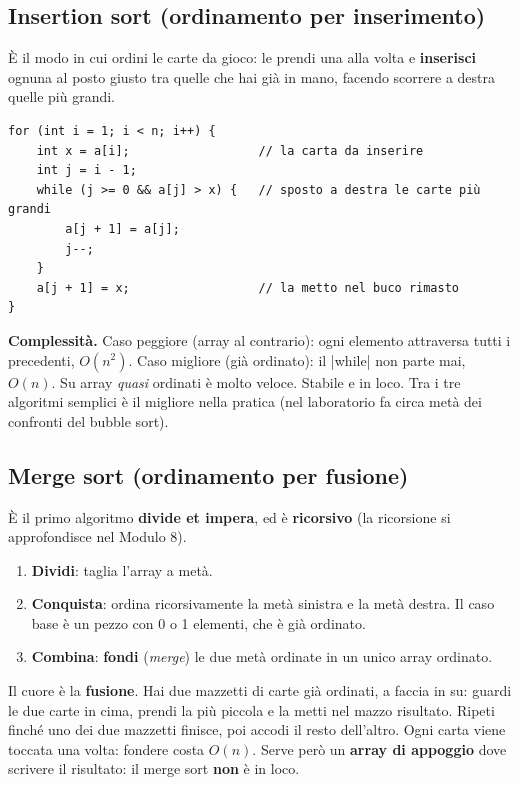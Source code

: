 \subsection*{Insertion sort (ordinamento per inserimento)}

\begin{analogia}
È il modo in cui ordini le carte da gioco: le prendi una alla volta e
\textbf{inserisci} ognuna al posto giusto tra quelle che hai già in mano, facendo
scorrere a destra quelle più grandi.
\end{analogia}

\begin{lstlisting}
for (int i = 1; i < n; i++) {
    int x = a[i];                  // la carta da inserire
    int j = i - 1;
    while (j >= 0 && a[j] > x) {   // sposto a destra le carte più grandi
        a[j + 1] = a[j];
        j--;
    }
    a[j + 1] = x;                  // la metto nel buco rimasto
}
\end{lstlisting}

\textbf{Complessità.} Caso peggiore (array al contrario): ogni elemento attraversa
tutti i precedenti, $O(n^2)$. Caso migliore (già ordinato): il \cc|while| non parte
mai, $O(n)$. Su array \emph{quasi} ordinati è molto veloce. Stabile e in loco. Tra i
tre algoritmi semplici è il migliore nella pratica (nel laboratorio fa circa metà
dei confronti del bubble sort).

\subsection*{Merge sort (ordinamento per fusione)}

È il primo algoritmo \textbf{divide et impera}, ed è \textbf{ricorsivo} (la
ricorsione si approfondisce nel Modulo 8).
\begin{passopasso}
\begin{enumerate}
  \item \textbf{Dividi}: taglia l'array a metà.
  \item \textbf{Conquista}: ordina ricorsivamente la metà sinistra e la metà destra.
        Il caso base è un pezzo con 0 o 1 elementi, che è già ordinato.
  \item \textbf{Combina}: \textbf{fondi} (\emph{merge}) le due metà ordinate in un
        unico array ordinato.
\end{enumerate}
\end{passopasso}

Il cuore è la \textbf{fusione}. Hai due mazzetti di carte già ordinati, a faccia in
su: guardi le due carte in cima, prendi la più piccola e la metti nel mazzo
risultato. Ripeti finché uno dei due mazzetti finisce, poi accodi il resto
dell'altro. Ogni carta viene toccata una volta: fondere costa $O(n)$. Serve però un
\textbf{array di appoggio} dove scrivere il risultato: il merge sort \textbf{non} è
in loco.

